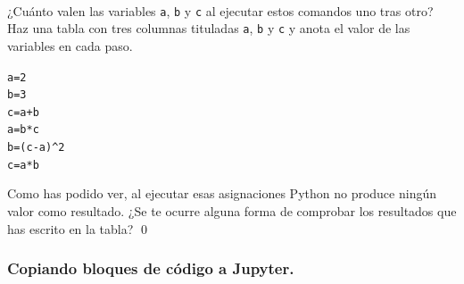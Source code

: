 \documentclass[10pt,a4paper]{article}\usepackage[]{graphicx}\usepackage[]{color}
\makeatletter
\newcommand{\hlnum}[1]{\textcolor[rgb]{0.686,0.059,0.569}{#1}}%
\newcommand{\hlopt}[1]{\textcolor[rgb]{0,0,0}{#1}}%
\newcommand{\hlstd}[1]{\textcolor[rgb]{0.345,0.345,0.345}{#1}}%
\newcommand{\hlkwb}[1]{\textcolor[rgb]{0.69,0.353,0.396}{#1}}%
\newenvironment{kframe}{%
 \def\at@end@of@kframe{}%
 \ifinner\ifhmode%
  \def\at@end@of@kframe{\end{minipage}}%
  \begin{minipage}{\columnwidth}%
 \fi\fi%
 \def\FrameCommand##1{\hskip\@totalleftmargin \hskip-\fboxsep
 \colorbox{shadecolor}{##1}\hskip-\fboxsep
     \hskip-\linewidth \hskip-\@totalleftmargin \hskip\columnwidth}%
 \MakeFramed {\advance\hsize-\width
   \@totalleftmargin\z@ \linewidth\hsize
   \@setminipage}}%
 {\par\unskip\endMakeFramed%
 \at@end@of@kframe}
\newenvironment{knitrout}{}{} %
\makeatother
\begin{document}
\begin{ejercicio}
\label{tut02:ejercicio08}
\quad\\
¿Cuánto valen las variables {\tt a}, {\tt b} y {\tt c} al ejecutar estos comandos uno tras otro? Haz una tabla con tres columnas tituladas {\tt a}, {\tt b} y {\tt c} y anota el valor de las variables en cada paso.
\begin{knitrout}
\color{fgcolor}\begin{kframe}
\begin{alltt}
\hlstd{a} \hlkwb{=} \hlnum{2}
\hlstd{b} \hlkwb{=} \hlnum{3}
\hlstd{c} \hlkwb{=} \hlstd{a} \hlopt{+} \hlstd{b}
\hlstd{a} \hlkwb{=} \hlstd{b} \hlopt{*} \hlstd{c}
\hlstd{b} \hlkwb{=} \hlstd{(c} \hlopt{-} \hlstd{a)}\hlopt{^}\hlnum{2}
\hlstd{c} \hlkwb{=} \hlstd{a} \hlopt{*} \hlstd{b}
\end{alltt}
\end{kframe}
\end{knitrout}
Como has podido ver, al ejecutar esas asignaciones Python no produce ningún valor como resultado. ¿Se te ocurre alguna forma de comprobar los resultados que has escrito en la tabla?
\qed
\end{ejercicio}

\subsubsection*{Copiando bloques de código a Jupyter.}
\label{tut02:subsubsec:copiandoBloquesCodigoJupyter}
\end{document}
